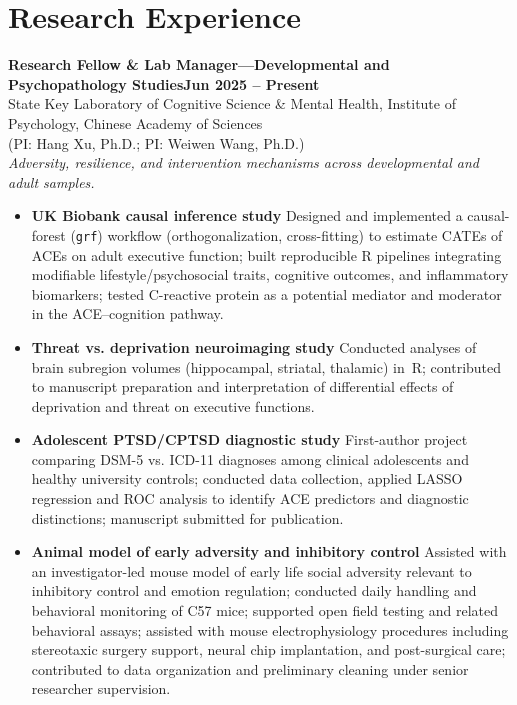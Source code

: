 \documentclass[10pt, letterpaper]{article}
\newenvironment{expitems}{
    \begin{itemize}[
        leftmargin=8pt,
        itemsep=1pt,
        topsep=2pt,
        parsep=0pt,
        partopsep=0pt
    ]
}{\end{itemize}}
\newcommand{\expheading}[2]{\noindent\textbf{#1}\hfill\textbf{#2}\\}
\newcommand{\expinfo}[1]{\noindent #1\\}
\newcommand{\expscope}[1]{\noindent\textit{#1}\\}
\begin{document}
\newpage
\section*{Research Experience}
\expheading{Research Fellow \& Lab Manager—Developmental and Psychopathology Studies}{Jun 2025 -- Present}
\expinfo{State Key Laboratory of Cognitive Science \& Mental Health, Institute of Psychology, Chinese Academy of Sciences \\ (PI: Hang Xu, Ph.D.; PI: Weiwen Wang, Ph.D.)}
\vspace{4pt}
\expscope{\textit{Adversity, resilience, and intervention mechanisms across developmental and adult samples.}}
\begin{expitems}
\item \textbf{UK Biobank causal inference study} Designed and implemented a causal-forest (\texttt{grf}) workflow (orthogonalization, cross-fitting) to estimate CATEs of ACEs on adult executive function; built reproducible R pipelines integrating modifiable lifestyle/psychosocial traits, cognitive outcomes, and inflammatory biomarkers; tested C-reactive protein as a potential mediator and moderator in the ACE–cognition pathway.

 \item \textbf{Threat vs. deprivation neuroimaging study} Conducted analyses of brain subregion volumes (hippocampal, striatal, thalamic) in~R; contributed to manuscript preparation and interpretation of differential effects of deprivation and threat on executive functions.

  \item \textbf{Adolescent PTSD/CPTSD diagnostic study} First-author project comparing DSM-5 vs. ICD-11 diagnoses among clinical adolescents and healthy university controls; conducted data collection, applied LASSO regression and ROC analysis to identify ACE predictors and diagnostic distinctions; manuscript submitted for publication.

    \item \textbf{Animal model of early adversity and inhibitory control} Assisted with an investigator-led mouse model of early life social adversity relevant to inhibitory control and emotion regulation; conducted daily handling and behavioral monitoring of C57 mice; supported open field testing and related behavioral assays; assisted with mouse electrophysiology procedures including stereotaxic surgery support, neural chip implantation, and post-surgical care; contributed to data organization and preliminary cleaning under senior researcher supervision.


\end{expitems}
\end{document}
